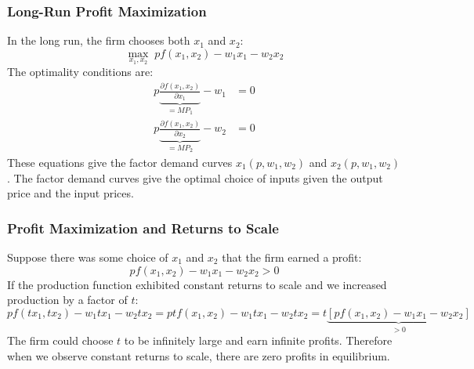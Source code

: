 \documentclass{article}
\begin{document}
\subsubsection*{Long-Run Profit Maximization}
In the long run, the firm chooses both $x_1$ and $x_2$:
\[
  \underset{x_1, x_2}{\max}\; pf\left( x_1,x_2 \right) - w_1x_1 - w_2x_2
\]
The optimality conditions are:
\begin{align*}
  p\underbrace{\frac{\partial f\left( x_1,x_2 \right)}{\partial x_1}}_{=MP_1} -
  w_1 &=0 \\
  p\underbrace{\frac{\partial f\left( x_1,x_2 \right)}{\partial x_2}}_{=MP_2} -
  w_2 &=0
\end{align*}
These equations give the factor demand curves $x_1\left( p,w_1,w_2 \right)$ and $x_2\left( p,w_1,w_2 \right)$. The factor demand curves give the optimal choice of inputs given the output price and the input prices.

\subsubsection*{Profit Maximization and Returns to Scale}
Suppose there was some choice of $x_1$ and $x_2$ that the firm earned a profit:
\[
pf\left( x_1,x_2 \right) - w_1x_1 - w_2x_2 > 0
\]
If the production function exhibited constant returns to scale and we increased production by a factor of $t$:
\[
pf\left( tx_1,tx_2 \right) - w_1tx_1 - w_2tx_2 =
ptf\left( x_1,x_2 \right) - w_1tx_1 - w_2tx_2 =
t\underbrace{\left[pf\left( x_1,x_2 \right) - w_1x_1 - w_2x_2\right]}_{>0}
\]
The firm could choose $t$ to be infinitely large and earn infinite profits. Therefore when we observe constant returns to scale, there are zero profits in equilibrium.
\end{document}
